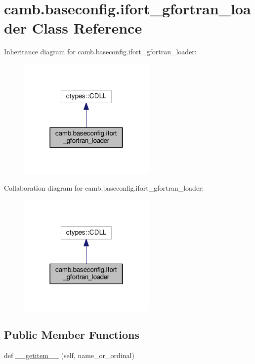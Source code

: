 \hypertarget{classcamb_1_1baseconfig_1_1ifort__gfortran__loader}{}\section{camb.\+baseconfig.\+ifort\+\_\+gfortran\+\_\+loader Class Reference}
\label{classcamb_1_1baseconfig_1_1ifort__gfortran__loader}


Inheritance diagram for camb.\+baseconfig.\+ifort\+\_\+gfortran\+\_\+loader\+:
\nopagebreak
\begin{figure}[H]
\begin{center}
\leavevmode
\includegraphics[width=190pt]{classcamb_1_1baseconfig_1_1ifort__gfortran__loader__inherit__graph}
\end{center}
\end{figure}


Collaboration diagram for camb.\+baseconfig.\+ifort\+\_\+gfortran\+\_\+loader\+:
\nopagebreak
\begin{figure}[H]
\begin{center}
\leavevmode
\includegraphics[width=190pt]{classcamb_1_1baseconfig_1_1ifort__gfortran__loader__coll__graph}
\end{center}
\end{figure}
\subsection*{Public Member Functions}
\begin{DoxyCompactItemize}
\item 
def \mbox{\hyperlink{classcamb_1_1baseconfig_1_1ifort__gfortran__loader_a85adcd6901ce884ec29852cabd345900}{\+\_\+\+\_\+getitem\+\_\+\+\_\+}} (self, name\+\_\+or\+\_\+ordinal)
\end{DoxyCompactItemize}


